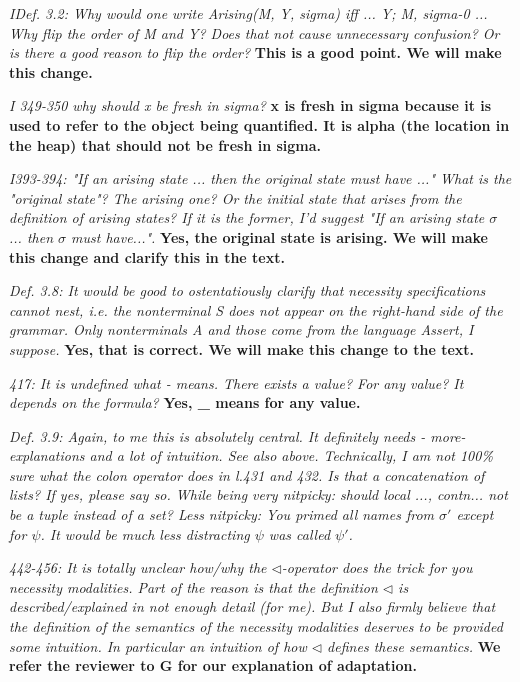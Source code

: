 \documentclass[11pt]{amsart}
\newcommand{\rev}[1]{\emph #1}
\newcommand{\us}[1]{\bf #1}
\begin{document}
 {\rev {{IDef. 3.2: Why would one write Arising(M, Y, sigma) iff ... Y; M, sigma-0 ... Why flip the order of M and Y? Does that not cause unnecessary confusion? Or is there a good reason to flip the order? }}}
 {\us{This is a good point. We will make this change.}}

{\rev {{I 349-350 why should x be fresh in sigma? }}}
{\us{x is fresh in sigma because it is used to refer to the object being quantified. It is alpha (the location in the heap) that should not be fresh in sigma.}}

{\rev {{I393-394: "If an arising state ... then the original state must have ..." What is the "original state"? The arising one? Or the initial state that arises from the definition of arising states? If it is the former, I'd suggest "If an arising state $\sigma$ ... then $\sigma$ must have...". }}}
{\us{Yes, the original state is arising. We will make this change and clarify this in the text.}}

{\rev {{Def. 3.8: It would be good to ostentatiously clarify that necessity specifications cannot nest, i.e. the nonterminal S does not appear on the right-hand side of the grammar. Only nonterminals A and those come from the language Assert, I suppose. }}}
{\us{Yes, that is correct. We will make this change to the text.}}

{\rev {{417: It is undefined what  - means. There exists a value? For any value? It depends on the formula? }}}
{\us{Yes, \_ means for any value.}}

{\rev {{ Def. 3.9: Again, to me this is absolutely central. It definitely needs - more- explanations and a lot of intuition. See also above. Technically, I am not 100\% sure what the colon operator does in l.431 and 432. Is that a concatenation of lists? If yes, please say so. While being very nitpicky: should {local ..., contn...} not be a tuple instead of a set? Less nitpicky: You primed all names from $\sigma'$ except for $\psi$. It would be much less distracting $\psi$ was called $\psi'$. }}}

{\rev {{442-456: It is totally unclear how/why the $\triangleleft$-operator does the trick for you necessity modalities. Part of the reason is that the definition $\triangleleft$ is described/explained in not enough detail (for me). But I also firmly believe that the definition of the semantics of the necessity modalities deserves to be provided some intuition. In particular an intuition of how $ \triangleleft$ defines these semantics. }}}
{\us{We refer the reviewer to G for our explanation of adaptation.}}
\end{document}
